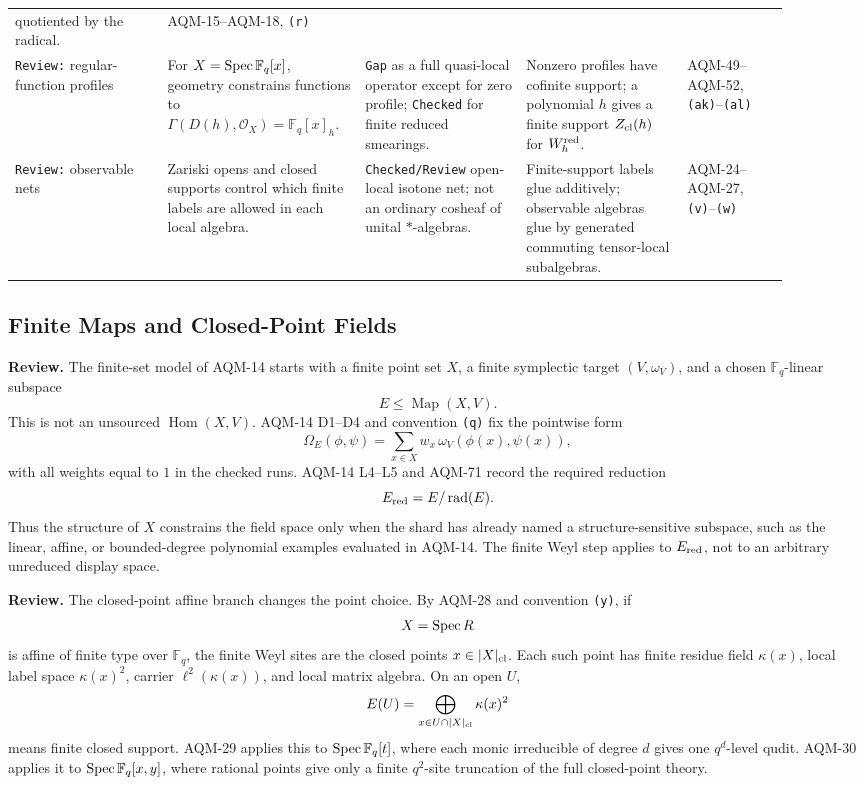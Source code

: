 \begin{center}
\begin{tabular}{p{0.18\linewidth}p{0.22\linewidth}p{0.19\linewidth}p{0.19\linewidth}p{0.12\linewidth}}
quotiented by the radical. &
AQM-15--AQM-18, \texttt{(r)} \\
\addlinespace
\texttt{Review:} regular-function profiles &
For \(X=\operatorname{Spec}\mathbb F_q[x]\), geometry constrains functions to
\(\Gamma(D(h),\mathcal O_X)=\mathbb F_q[x]_h\). &
\texttt{Gap} as a full quasi-local operator except for zero profile;
\texttt{Checked} for finite reduced smearings. &
Nonzero profiles have cofinite support; a polynomial \(h\) gives a finite
support \(Z_{\rm cl}(h)\) for \(W_h^{\rm red}\). &
AQM-49--AQM-52, \texttt{(ak)}--\texttt{(al)} \\
\addlinespace
\texttt{Review:} observable nets &
Zariski opens and closed supports control which finite labels are allowed in
each local algebra. &
\texttt{Checked/Review} open-local isotone net; not an ordinary cosheaf of
unital \(*\)-algebras. &
Finite-support labels glue additively; observable algebras glue by generated
commuting tensor-local subalgebras. &
AQM-24--AQM-27, \texttt{(v)}--\texttt{(w)} \\
\bottomrule
\end{tabular}
\end{center}

\subsection{Finite Maps and Closed-Point Fields}

\textbf{Review.}  The finite-set model of AQM-14 starts with a finite point set
\(X\), a finite symplectic target \((V,\omega_V)\), and a chosen
\(\mathbb F_q\)-linear subspace
\[
  E\leq \operatorname{Map}(X,V).
\]
This is not an unsourced \(\operatorname{Hom}(X,V)\).  AQM-14 D1--D4 and
convention \texttt{(q)} fix the pointwise form
\[
  \Omega_E(\phi,\psi)=
  \sum_{x\in X}w_x\,\omega_V(\phi(x),\psi(x)),
\]
with all weights equal to \(1\) in the checked runs.  AQM-14 L4--L5 and
AQM-71 record the required reduction
\[
  E_{\rm red}=E/\operatorname{rad}(E).
\]
Thus the structure of \(X\) constrains the field space only when the shard
has already named a structure-sensitive subspace, such as the linear, affine,
or bounded-degree polynomial examples evaluated in AQM-14.  The finite Weyl
step applies to \(E_{\rm red}\), not to an arbitrary unreduced display space.

\textbf{Review.}  The closed-point affine branch changes the point choice.
By AQM-28 and convention \texttt{(y)}, if
\[
  X=\operatorname{Spec} R
\]
is affine of finite type over \(\mathbb F_q\), the finite Weyl sites are the
closed points \(x\in |X|_{\rm cl}\).  Each such point has finite residue field
\(\kappa(x)\), local label space \(\kappa(x)^2\), carrier
\(\ell^2(\kappa(x))\), and local matrix algebra.  On an open \(U\),
\[
  E(U)=\bigoplus_{x\in U\cap |X|_{\rm cl}}\kappa(x)^2
\]
means finite closed support.  AQM-29 applies this to \(\operatorname{Spec}\mathbb F_q[t]\),
where each monic irreducible of degree \(d\) gives one \(q^d\)-level qudit.
AQM-30 applies it to \(\operatorname{Spec}\mathbb F_q[x,y]\), where rational points give
only a finite \(q^2\)-site truncation of the full closed-point theory.

